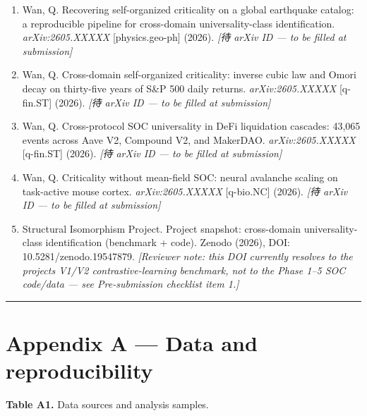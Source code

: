 \documentclass[
  11pt]{article}
\providecommand{\tightlist}{%
  \setlength{\itemsep}{0pt}\setlength{\parskip}{0pt}}
\begin{document}
\begin{enumerate}
\def\labelenumi{\arabic{enumi}.}
\setcounter{enumi}{40}
\tightlist
\item
  Wan, Q. Recovering self-organized criticality on a global earthquake
  catalog: a reproducible pipeline for cross-domain universality-class
  identification. \emph{arXiv:2605.XXXXX} {[}physics.geo-ph{]} (2026).
  \emph{{[}待 arXiv ID --- to be filled at submission{]}}
\item
  Wan, Q. Cross-domain self-organized criticality: inverse cubic law and
  Omori decay on thirty-five years of S\&P 500 daily returns.
  \emph{arXiv:2605.XXXXX} {[}q-fin.ST{]} (2026). \emph{{[}待 arXiv ID
  --- to be filled at submission{]}}
\item
  Wan, Q. Cross-protocol SOC universality in DeFi liquidation cascades:
  43,065 events across Aave V2, Compound V2, and MakerDAO.
  \emph{arXiv:2605.XXXXX} {[}q-fin.ST{]} (2026). \emph{{[}待 arXiv ID
  --- to be filled at submission{]}}
\item
  Wan, Q. Criticality without mean-field SOC: neural avalanche scaling
  on task-active mouse cortex. \emph{arXiv:2605.XXXXX} {[}q-bio.NC{]}
  (2026). \emph{{[}待 arXiv ID --- to be filled at submission{]}}
\item
  Structural Isomorphism Project. Project snapshot: cross-domain
  universality-class identification (benchmark + code). Zenodo (2026),
  DOI: 10.5281/zenodo.19547879. \emph{{[}Reviewer note: this DOI
  currently resolves to the project\textquotesingle s V1/V2
  contrastive-learning benchmark, not to the Phase 1--5 SOC code/data
  --- see Pre-submission checklist item 1.{]}}
\end{enumerate}

\begin{center}\rule{0.5\linewidth}{0.5pt}\end{center}

\section*{Appendix A --- Data and reproducibility}\label{appendix-a--data-and-reproducibility}

\textbf{Table A1.} Data sources and analysis samples.
\end{document}
